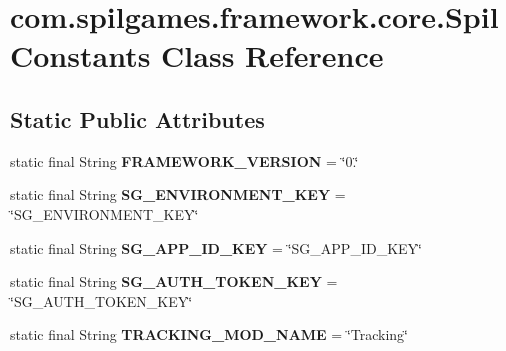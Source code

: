 \hypertarget{classcom_1_1spilgames_1_1framework_1_1core_1_1_spil_constants}{\section{com.\-spilgames.\-framework.\-core.\-Spil\-Constants Class Reference}
\label{classcom_1_1spilgames_1_1framework_1_1core_1_1_spil_constants}
}
\subsection*{Static Public Attributes}
\begin{DoxyCompactItemize}
\item 
\hypertarget{classcom_1_1spilgames_1_1framework_1_1core_1_1_spil_constants_af14ca0c8b1877f1d111817f3f391f542}{static final String {\bfseries F\-R\-A\-M\-E\-W\-O\-R\-K\-\_\-\-V\-E\-R\-S\-I\-O\-N} = \char`\"{}0.\char`\"{}}\label{classcom_1_1spilgames_1_1framework_1_1core_1_1_spil_constants_af14ca0c8b1877f1d111817f3f391f542}

\item 
\hypertarget{classcom_1_1spilgames_1_1framework_1_1core_1_1_spil_constants_a212418ee8b635af4c6e507f304e18341}{static final String {\bfseries S\-G\-\_\-\-E\-N\-V\-I\-R\-O\-N\-M\-E\-N\-T\-\_\-\-K\-E\-Y} = \char`\"{}S\-G\-\_\-\-E\-N\-V\-I\-R\-O\-N\-M\-E\-N\-T\-\_\-\-K\-E\-Y\char`\"{}}\label{classcom_1_1spilgames_1_1framework_1_1core_1_1_spil_constants_a212418ee8b635af4c6e507f304e18341}

\item 
\hypertarget{classcom_1_1spilgames_1_1framework_1_1core_1_1_spil_constants_ad9a51d280d366b16f892efa2a107b5ec}{static final String {\bfseries S\-G\-\_\-\-A\-P\-P\-\_\-\-I\-D\-\_\-\-K\-E\-Y} = \char`\"{}S\-G\-\_\-\-A\-P\-P\-\_\-\-I\-D\-\_\-\-K\-E\-Y\char`\"{}}\label{classcom_1_1spilgames_1_1framework_1_1core_1_1_spil_constants_ad9a51d280d366b16f892efa2a107b5ec}

\item 
\hypertarget{classcom_1_1spilgames_1_1framework_1_1core_1_1_spil_constants_ab7c9dbf820d68ff2d395bdd3ece0ff9f}{static final String {\bfseries S\-G\-\_\-\-A\-U\-T\-H\-\_\-\-T\-O\-K\-E\-N\-\_\-\-K\-E\-Y} = \char`\"{}S\-G\-\_\-\-A\-U\-T\-H\-\_\-\-T\-O\-K\-E\-N\-\_\-\-K\-E\-Y\char`\"{}}\label{classcom_1_1spilgames_1_1framework_1_1core_1_1_spil_constants_ab7c9dbf820d68ff2d395bdd3ece0ff9f}

\item 
\hypertarget{classcom_1_1spilgames_1_1framework_1_1core_1_1_spil_constants_a8d056750ff9d005cf879012110930ac9}{static final String {\bfseries T\-R\-A\-C\-K\-I\-N\-G\-\_\-\-M\-O\-D\-\_\-\-N\-A\-M\-E} = \char`\"{}Tracking\char`\"{}}\label{classcom_1_1spilgames_1_1framework_1_1core_1_1_spil_constants_a8d056750ff9d005cf879012110930ac9}


\end{DoxyCompactItemize}
